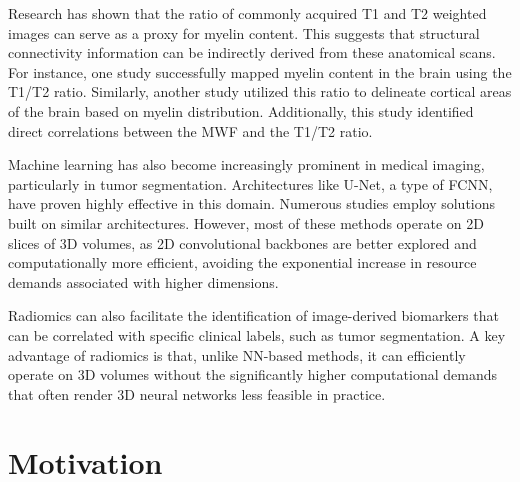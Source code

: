 Research has shown that the ratio of commonly acquired T1 and T2 weighted images can serve as a proxy for myelin content. This suggests that structural connectivity information can be indirectly derived from these anatomical scans. For instance, one study \cite{myelin2} successfully mapped myelin content in the brain using the T1/T2 ratio. Similarly, another study \cite{myelin} utilized this ratio to delineate cortical areas of the brain based on myelin distribution. Additionally, this study \cite{myelin3} identified direct correlations between the \ac{MWF} and the T1/T2 ratio.\par
Machine learning has also become increasingly prominent in medical imaging, particularly in tumor segmentation. Architectures like U-Net, a type of \ac{FCNN}, have proven highly effective in this domain. Numerous studies \cite{unetseg} \cite{unetseg2} \cite{unetseg3} \cite{unetseg4} \cite{unetseg5} employ solutions built on similar architectures. However, most of these methods operate on 2D slices of 3D volumes, as 2D convolutional backbones are better explored and computationally more efficient, avoiding the exponential increase in resource demands associated with higher dimensions.\par
Radiomics can also facilitate the identification of image-derived biomarkers that can be correlated with specific clinical labels, such as tumor segmentation. \cite{radioseg} \cite{radioseg2} \cite{radioseg3} A key advantage of radiomics is that, unlike \ac{NN}-based methods, it can efficiently operate on 3D volumes without the significantly higher computational demands that often render 3D neural networks less feasible in practice.

\section{Motivation}

